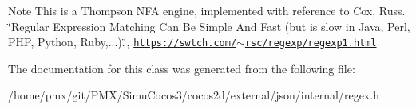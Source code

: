 \begin{DoxyNote}{Note}
This is a Thompson N\+FA engine, implemented with reference to Cox, Russ. \char`\"{}\+Regular Expression Matching Can Be Simple And Fast (but is slow in Java, Perl, P\+H\+P, Python, Ruby,...).\char`\"{}, \href{https://swtch.com/~rsc/regexp/regexp1.html}{\tt https\+://swtch.\+com/$\sim$rsc/regexp/regexp1.\+html} 
\end{DoxyNote}


The documentation for this class was generated from the following file\+:\begin{DoxyCompactItemize}
\item 
/home/pmx/git/\+P\+M\+X/\+Simu\+Cocos3/cocos2d/external/json/internal/regex.\+h\end{DoxyCompactItemize}
